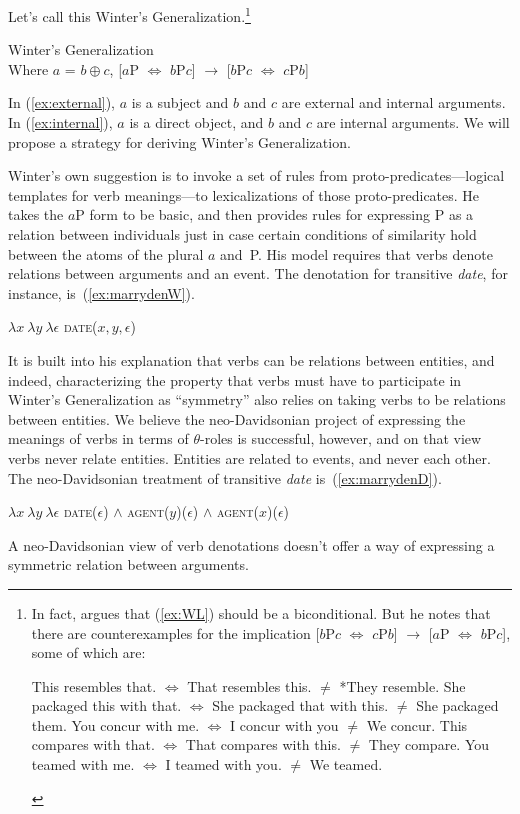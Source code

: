 \documentclass[twoside, 12pt]{article}
\begin{document}
Let's call this Winter's Generalization.\footnote{In fact, \citet{Winter:2018} argues that (\ref{ex:WL}) should be a biconditional. But he notes that there are counterexamples for the implication [$b$P$c$ $\Leftrightarrow$ $c$P$b$] $\rightarrow$ [$a$P $\Leftrightarrow$ $b$P$c$], some of which are:
\begin{exe}
\raggedright
  \begin{xlist}
    \ex This resembles that. $\Leftrightarrow$ That resembles this. $\neq$ *They resemble.
    \ex She packaged this with that. $\Leftrightarrow$ She packaged that with this. $\neq$ She packaged them.
    \ex You concur with me. $\Leftrightarrow$ I concur with you $\neq$ We concur.
    \ex This compares with that. $\Leftrightarrow$ That compares with this. $\neq$ They compare.
    \ex You teamed with me. $\Leftrightarrow$ I teamed with you. $\neq$ We teamed.
  \end{xlist}
\end{exe}}
\begin{exe}
\raggedright
  \ex \label{ex:WL} Winter's Generalization\\
  Where $a$ = $b \oplus c$, [$a$P $\Leftrightarrow$ $b$P$c$] $\rightarrow$ [$b$P$c$ $\Leftrightarrow$ $c$P$b$]
\end{exe}
In (\ref{ex:external}), $a$ is a subject and $b$ and $c$ are external and internal arguments. In (\ref{ex:internal}), $a$ is a direct object, and $b$ and $c$ are internal arguments. We will propose a strategy for deriving Winter's Generalization.

Winter's own suggestion is to invoke a set of rules from proto-predicates---logical templates for verb meanings---to lexicalizations of those proto-predicates. He takes the $a$P form to be basic, and then provides rules for expressing P as a relation between individuals just in case certain conditions of similarity hold between the atoms of the plural $a$ and~P. His model requires that verbs denote relations between arguments and an event. The denotation for transitive \textit{date}, for instance, is~(\ref{ex:marrydenW}).
\begin{exe}
\raggedright
  \ex \label{ex:marrydenW} $\lambda x\ \lambda y\ \lambda \epsilon$ \textsc{date}($x,y,\epsilon$)
\end{exe}
It is built into his explanation that verbs can be relations between entities, and indeed, characterizing the property that verbs must have to participate in Winter's Generalization as ``symmetry'' also relies on taking verbs to be relations between entities. We believe the neo-Davidsonian project of expressing the meanings of verbs in terms of $\theta$-roles is successful, however, and on that view verbs never relate entities. Entities are related to events, and never each other. The neo-Davidsonian treatment of transitive \textit{date} is~(\ref{ex:marrydenD}).
\begin{exe}
\raggedright
  \ex \label{ex:marrydenD} $\lambda x\ \lambda y\ \lambda \epsilon$ \textsc{date}($\epsilon$) $\wedge$ \textsc{agent}($y$)($\epsilon$) $\wedge$ \textsc{agent}($x$)($\epsilon$)
\end{exe}
A neo-Davidsonian view of verb denotations doesn't offer a way of expressing a symmetric relation between arguments. 
\end{document}
